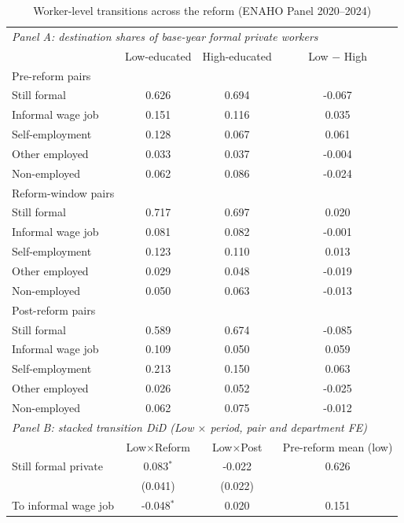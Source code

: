 \begin{table}[!tbp]\centering
\caption{Worker-level transitions across the reform (ENAHO Panel 2020--2024)}\label{tab:transitions}
\begin{threeparttable}
\footnotesize
\setlength{\tabcolsep}{5pt}
\begin{tabular}{lccc}
\toprule
\multicolumn{4}{l}{\emph{Panel A: destination shares of base-year formal private workers}}\\
 & Low-educated & High-educated & Low $-$ High \\
\midrule
\multicolumn{4}{l}{Pre-reform pairs}\\
\quad Still formal & 0.626 & 0.694 & -0.067 \\
\quad Informal wage job & 0.151 & 0.116 & 0.035 \\
\quad Self-employment & 0.128 & 0.067 & 0.061 \\
\quad Other employed & 0.033 & 0.037 & -0.004 \\
\quad Non-employed & 0.062 & 0.086 & -0.024 \\
\multicolumn{4}{l}{Reform-window pairs}\\
\quad Still formal & 0.717 & 0.697 & 0.020 \\
\quad Informal wage job & 0.081 & 0.082 & -0.001 \\
\quad Self-employment & 0.123 & 0.110 & 0.013 \\
\quad Other employed & 0.029 & 0.048 & -0.019 \\
\quad Non-employed & 0.050 & 0.063 & -0.013 \\
\multicolumn{4}{l}{Post-reform pairs}\\
\quad Still formal & 0.589 & 0.674 & -0.085 \\
\quad Informal wage job & 0.109 & 0.050 & 0.059 \\
\quad Self-employment & 0.213 & 0.150 & 0.063 \\
\quad Other employed & 0.026 & 0.052 & -0.025 \\
\quad Non-employed & 0.062 & 0.075 & -0.012 \\
\midrule
\multicolumn{4}{l}{\emph{Panel B: stacked transition DiD (Low $\times$ period, pair and department FE)}}\\
 & Low$\times$Reform & Low$\times$Post & Pre-reform mean (low) \\ \midrule
Still formal private & 0.083$^{*}$ & -0.022 & 0.626 \\
 & (0.041) & (0.022) & \\
To informal wage job & -0.048$^{*}$ & 0.020 & 0.151 \\

\end{tabular}
\end{threeparttable}
\end{table}

